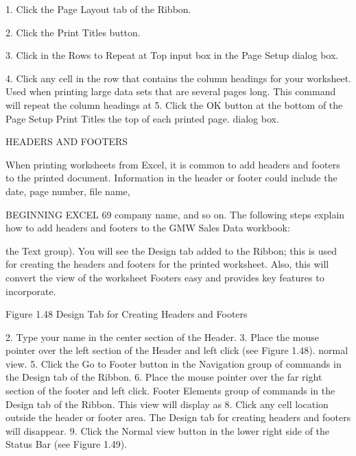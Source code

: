 1. Click the Page Layout tab of the Ribbon.

2. Click the Print Titles button.

3. Click in the Rows to Repeat at Top input box in the
Page Setup dialog box.

4. Click any cell in the row that contains the column
headings for your worksheet.
Used when printing large data sets that are several pages
long. This command will repeat the column headings at         5. Click the OK button at the bottom of the Page Setup
Print Titles   the top of each printed page.                                 dialog box.


HEADERS AND FOOTERS

When printing worksheets from Excel, it is common to add headers and footers to the printed
document. Information in the header or footer could include the date, page number, file name,


BEGINNING EXCEL 69
company name, and so on. The following steps explain how to add headers and footers to the GMW
Sales Data workbook:

the Text group). You will see the Design tab added to the Ribbon; this is used for creating the
headers and footers for the printed worksheet. Also, this will convert the view of the worksheet
Footers easy and provides key features to incorporate.




Figure 1.48 Design Tab for Creating Headers and Footers




2. Type your name in the center section of the Header.
3. Place the mouse pointer over the left section of the Header and left click (see Figure 1.48).
normal view.
5. Click the Go to Footer button in the Navigation group of commands in the Design tab of the
Ribbon.
6. Place the mouse pointer over the far right section of the footer and left click.
Footer Elements group of commands in the Design tab of the Ribbon. This view will display as
8. Click any cell location outside the header or footer area. The Design tab for creating headers
and footers will disappear.
9. Click the Normal view button in the lower right side of the Status Bar (see Figure 1.49).

